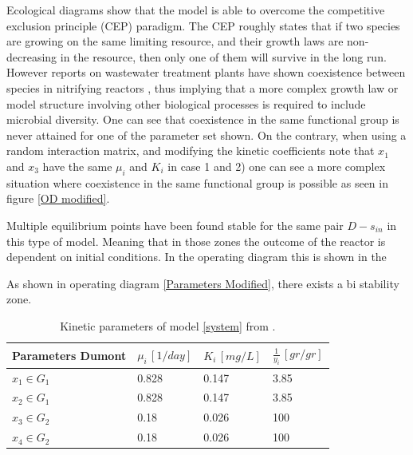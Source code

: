 \documentclass[3p,times]{elsarticle}
\begin{document}
Ecological diagrams show that the model is able to overcome the  competitive exclusion principle \cite{lobry2017chemostat} (CEP) paradigm. The CEP roughly states that if two species are growing on the same limiting resource, and their growth laws are non-decreasing in the resource, then only one of them will survive in the long run. However reports on wastewater treatment plants have shown coexistence between species in nitrifying reactors \cite{Wagner2002}, thus implying that a more complex growth law or model structure involving other biological processes is required to include microbial diversity. One can see that coexistence in the same functional group is never attained for one of the parameter set shown. On the contrary, when using a random interaction matrix, and modifying the kinetic coefficients note that $x_1$ and $x_3$ have the same $\mu_i$ and $K_i$ in case 1 and 2) one can see a more complex situation where coexistence in the same functional group is possible as seen in figure \ref{OD modified}.

Multiple equilibrium points have been found stable for the same pair $D-s_{in}$ in this type of model. Meaning that in those zones the outcome of the reactor is dependent on initial conditions. In the operating diagram this is shown in the 

As shown in operating diagram \ref{Parameters Modified}, there exists a bi stability zone.

\begin{table}[ht]
	\centering
	\begin{tabular}{|l|l|l|l|}
		\hline
		Parameters Dumont & $\mu_i\,[1/day]$ & $K_i\,[mg/L]$ & $\frac{1}{y_i} \, [gr/gr]$ \\ \hline
		$x_1 \in G_1$ & 0.828  & 0.147 & 3.85  \\ \hline
		$x_2\in G_1$ &0.828   & 0.147 &  3.85\\ \hline
		$x_3\in G_2$ & 0.18 & 0.026 &  100 \\ \hline
		$x_4\in G_2$ & 0.18 & 0.026 &  100 \\ \hline
	\end{tabular}
	\caption{Kinetic parameters of model \eqref{system} from \cite{Dumont2016}.}
	\label{Parameters Dumont}
\end{table}
\end{document}
